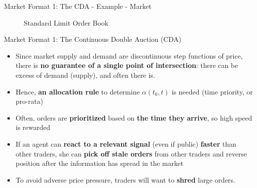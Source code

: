 \documentclass[10pt]{beamer}
\begin{document}
\begin{frame}{Market Format 1: The CDA - Example - Market}
    \begin{figure}[H]
        \centering
        \caption{Standard Limit Order Book}
    \end{figure}
\end{frame}

\begin{frame}{Market Format 1: The Continuous Double Auction (CDA)}
    \begin{itemize}
        \item Since market supply and demand are discontinuous step functions of price, there is \textbf{no guarantee of a single point of intersection}: there can be excess of demand (supply), and often there is. 
        \item Hence, \textbf{an allocation rule} to determine $\alpha(t_0, t)$ is needed (time priority, or pro-rata)
        \item Often, orders are \textbf{prioritized} based on \textbf{the time they arrive}, so high speed is rewarded
        \item If an agent can \textbf{react to a relevant signal} (even if public) \textbf{faster} than other traders, she can \textbf{pick off stale orders} from other traders and reverse position after the information has spread in the market
        \item To avoid adverse price pressure, traders will want to \textbf{shred} large orders.
    \end{itemize}
\end{frame}
\end{document}
